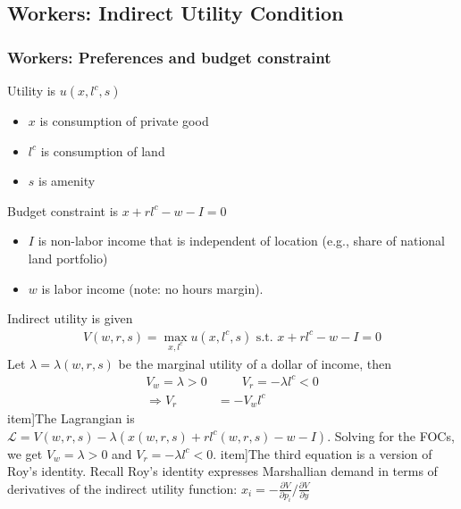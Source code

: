 \documentclass[10pt,notes=hide]{beamer}
\begin{document}
\subsection{Workers: Indirect Utility Condition}
\begin{frame}
\frametitle{Workers: Preferences and budget constraint}
Utility is $u(x, l^c, s)$
\begin{itemize}
\item  $x$ is consumption of private good
\item  $l^c$ is consumption of land
\item  $s$ is amenity
\end{itemize}
Budget constraint is $x + rl^c - w - I = 0$
\begin{itemize}
\item $I$ is non-labor income that is independent of location (e.g., share of national land portfolio)
\item $w$ is labor income (note: no hours margin).
\end{itemize}
Indirect utility is given
\begin{align*}
V(w, r, s)  = \max_{x, l^c} u(x, l^c, s) \text{ s.t. }  x + rl^c - w - I = 0
\end{align*}
Let $\lambda  = \lambda(w, r, s)$ be the marginal utility of a dollar of income, then 
\begin{align*}
V_w = \lambda >0
& \qquad 
V_r = -\lambda l^c <0 
\\
\Rightarrow
V_r &= - V_w l^c
\end{align*}
item]{The Lagrangian is $\mathcal{L} = V(w, r, s) - \lambda(x(w, r, s) + rl^c(w, r, s) - w - I)$. Solving for the FOCs, we get $V_w = \lambda >0$ and $V_r = -\lambda l^c <0$.}
item]{The third equation is a version of Roy's identity. Recall Roy's identity expresses Marshallian demand in terms of derivatives of the indirect utility function: $x_{i} = - \frac{\partial V}{\partial p_{i}} / \frac{\partial V}{\partial y}$}
\end{frame}
\end{document}
